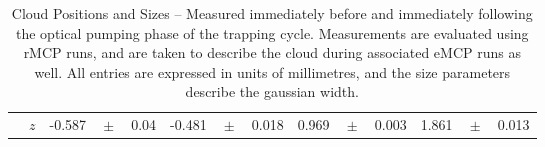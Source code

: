 \begin{table}[h!!!!t]
\begin{center}
\begin{tabular}{ c  | r || lcl | lcl || lcl | lcl |}
								& $z$ & -0.587    & \!\!$\!\! \pm  \!\!$\!\! & 0.04   & -0.481  & \!\!$\!\! \pm  \!\!$\!\! & 0.018 & 0.969 & \!\!$\!\! \pm  \!\!$\!\! & 0.003 & 1.861 & \!\!$\!\! \pm  \!\!$\!\! & 0.013 \\
			\cline{2-14}
	\end{tabular}
	\end{center}
	\caption[Cloud Position and Size]{Cloud Positions and Sizes -- Measured immediately before and immediately following the optical pumping phase of the trapping cycle.  Measurements are evaluated using rMCP runs, and are taken to describe the cloud during associated eMCP runs as well.  All entries are expressed in units of millimetres, and the size parameters describe the gaussian width.}
	\label{table:cloudpositions}
\end{table}

